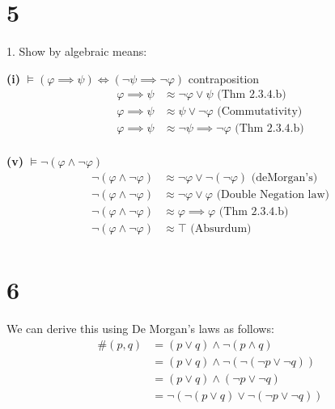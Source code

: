 \documentclass[10pt]{article}
\begin{document}
\newpage
\section*{5}
\begin{description*}
	\item[1.] Show by algebraic means:
\end{description*}

\textbf{(i)} $\models (\varphi \implies \psi) \iff (\lnot \psi \implies \lnot \varphi)$ contraposition
\begin{align*}
	\varphi \implies \psi &\approx \lnot \varphi \vee \psi \text{ (Thm 2.3.4.b)}\\
	\varphi \implies \psi &\approx \psi \vee \lnot \varphi \text{ (Commutativity)}\\
	\varphi \implies \psi &\approx \lnot \psi \implies \lnot \varphi \text{ (Thm 2.3.4.b)}\\
\end{align*}

\textbf{(v)} $\models \lnot(\varphi \wedge \lnot \varphi)$
\begin{align*}
	\lnot(\varphi \wedge \lnot \varphi) &\approx \lnot \varphi \vee \lnot(\lnot \varphi) \text{ (deMorgan's)}\\
	\lnot(\varphi \wedge \lnot \varphi) &\approx \lnot \varphi \vee \varphi \text{ (Double Negation law)}\\
	\lnot(\varphi \wedge \lnot \varphi) &\approx \varphi \implies \varphi \text{ (Thm 2.3.4.b)} \\
	\lnot(\varphi \wedge \lnot \varphi) &\approx \top \text{ (Absurdum)} \\
\end{align*}


\section*{6}
We can derive this using De Morgan's laws as follows:
\begin{align*}
\# (p,q) &= (p\lor q) \land \lnot (p \land q) \\
         &= (p\lor q) \land \lnot (\lnot (\lnot p \lor \lnot q)) \\
         &= (p\lor q) \land (\lnot p \lor \lnot q) \\
         &= \lnot (\lnot (p \lor q ) \lor \lnot (\lnot p \lor \lnot q))
\end{align*}
\end{document}
